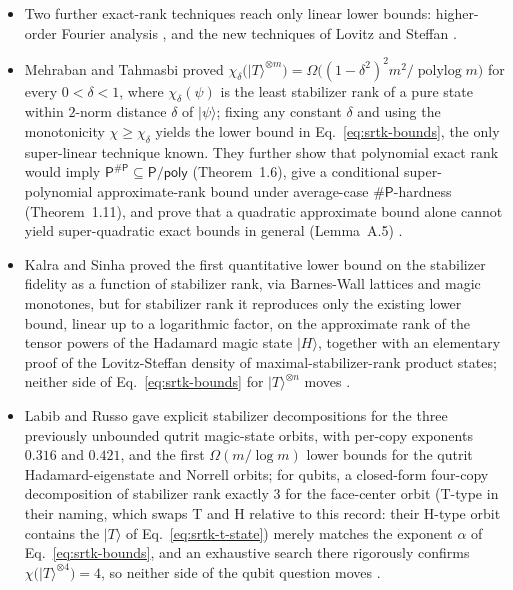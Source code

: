 \begin{itemize}
  \item Two further exact-rank techniques reach only linear lower bounds:
  higher-order Fourier analysis , and the
  new techniques of Lovitz and Steffan
  .

  \item Mehraban and Tahmasbi proved $\chi_{\delta}\bigl(|T\rangle^{\otimes
  m}\bigr) = \Omega\bigl((1-\delta^{2})^{2} m^{2}/\operatorname{polylog}
  m\bigr)$ for every $0 < \delta < 1$, where $\chi_{\delta}(\psi)$ is the
  least stabilizer rank of a pure state within $2$-norm distance $\delta$
  of $|\psi\rangle$; fixing any constant $\delta$ and using the
  monotonicity $\chi \ge \chi_{\delta}$ yields the lower bound in
  Eq.~\eqref{eq:srtk-bounds}, the only super-linear technique known.  They
  further show that polynomial exact rank would imply
  $\mathsf{P}^{\#\mathsf{P}} \subseteq \mathsf{P}/\mathsf{poly}$
  (Theorem~1.6), give a conditional super-polynomial approximate-rank bound
  under average-case $\#\mathsf{P}$-hardness (Theorem~1.11), and prove that
  a quadratic approximate bound alone cannot yield super-quadratic exact
  bounds in general (Lemma~A.5) .

  \item Kalra and Sinha proved the first quantitative lower bound on the
  stabilizer fidelity as a function of stabilizer rank, via Barnes-Wall
  lattices and magic monotones, but for stabilizer rank it reproduces only
  the existing lower bound, linear up to a logarithmic factor, on the
  approximate rank of the tensor powers of the Hadamard magic state
  $|H\rangle$, together with an elementary proof of the Lovitz-Steffan
  density of maximal-stabilizer-rank product states; neither side of
  Eq.~\eqref{eq:srtk-bounds} for $|T\rangle^{\otimes n}$ moves
  .

  \item Labib and Russo gave explicit stabilizer decompositions for the three
  previously unbounded qutrit magic-state orbits, with per-copy exponents
  $0.316$ and $0.421$, and the first $\Omega(m/\log m)$ lower bounds for
  the qutrit Hadamard-eigenstate and Norrell orbits; for qubits, a
  closed-form four-copy decomposition of stabilizer rank exactly $3$ for
  the face-center orbit (T-type in their naming, which swaps T and H
  relative to this record: their H-type orbit contains the $|T\rangle$ of
  Eq.~\eqref{eq:srtk-t-state}) merely matches the exponent $\alpha$ of
  Eq.~\eqref{eq:srtk-bounds}, and an exhaustive search there rigorously
  confirms $\chi\bigl(|T\rangle^{\otimes 4}\bigr) = 4$, so neither side
  of the qubit question moves .
\end{itemize}

